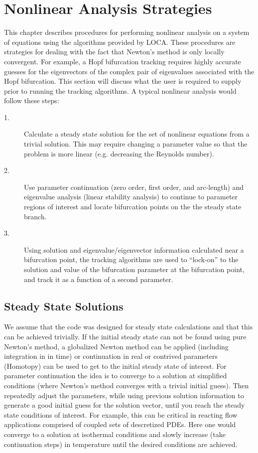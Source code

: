 \chapter{Nonlinear Analysis Strategies}
\label{ch:strategies}
This chapter describes procedures for performing nonlinear analysis on a system of equations using the algorithms provided by LOCA. These procedures are strategies for dealing with the fact that Newton's method is only locally convergent. For example, a Hopf bifurcation tracking requires highly accurate guesses for the eigenvectors of the complex pair of eigenvalues associated with the Hopf bifurcation. This section will discuss what the user is required to supply prior to running the tracking algorithms.  A typical nonlinear analysis would follow these steps:
\begin{description}
\item[1.] Calculate a steady state solution for the set of nonlinear equations from a trivial solution. This may require changing a parameter value so that the problem is more linear (e.g. decreasing the Reynolds number).
\item[2.] Use parameter continuation (zero order, first order, and arc-length) and eigenvalue analysis (linear stability analysis) to continue to parameter regions of interest and locate bifurcation points on the the steady state branch.
\item[3.] Using solution and eigenvalue/eigenvector information calculated near a bifurcation point, the tracking algorithms are used to ``lock-on'' to the solution and value of the bifurcation parameter at the bifurcation point, and track it as a function of a second parameter.
\end{description}

\section{Steady State Solutions}
We assume that the code was designed for steady state calculations and that this can be achieved trivially.  If the initial steady state can not be found using pure Newton's method, a globalized Newton method can be applied \cite{dennis83,nocedal99,more92,more83} (including integration in in time) or continuation in real or contrived parameters (Homotopy) can be used to get to the initial steady state of interest.  For parameter continuation the idea is to converge to a solution at simplified conditions (where Newton's method converges with a trivial initial guess). Then repeatedly adjust the parameters, while using previous solution information to generate a good initial guess for the solution vector, until you reach the steady state conditions of interest.  For example, this can be critical in reacting flow applications comprised of coupled sets of descretized PDEs. Here one would converge to a solution at isothermal conditions and slowly increase (take continuation steps) in temperature until the desired conditions are achieved.

